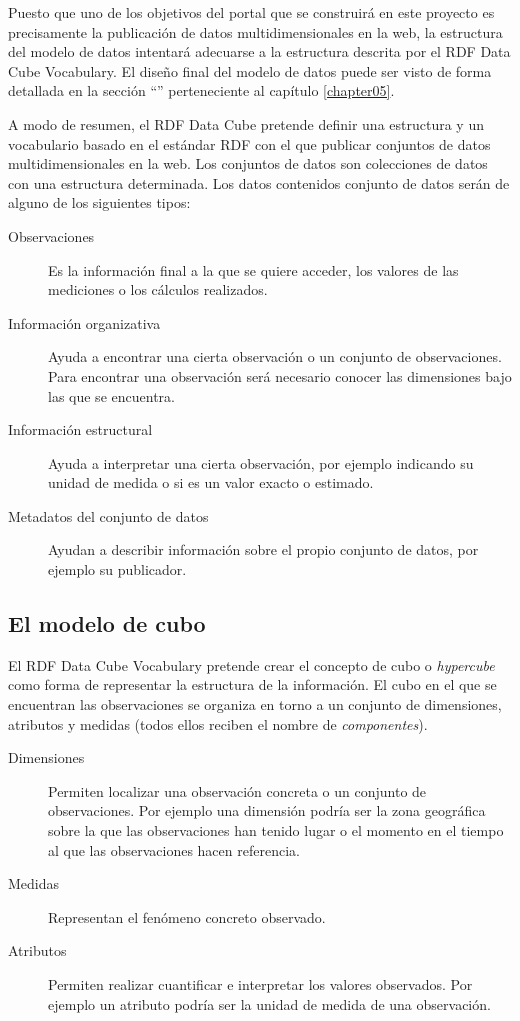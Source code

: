 Puesto que uno de los objetivos del portal que se construirá en este proyecto es precisamente la publicación de datos multidimensionales en la web, la estructura del modelo de datos intentará adecuarse a la estructura descrita por el RDF Data Cube Vocabulary.  El diseño final del modelo de datos puede ser visto de forma detallada en la sección ``'' perteneciente al capítulo \ref{chapter05}.

A modo de resumen, el RDF Data Cube pretende definir una estructura y un vocabulario basado en el estándar RDF con el que publicar conjuntos de datos multidimensionales en la web.  Los conjuntos de datos son colecciones de datos con una estructura determinada.  Los datos contenidos conjunto de datos serán de alguno de los siguientes tipos:
\begin{description}
\item[Observaciones]  Es la información final a la que se quiere acceder, los valores de las mediciones o los cálculos realizados.
\item[Información organizativa]  Ayuda a encontrar una cierta observación o un conjunto de observaciones.  Para encontrar una observación será necesario conocer las dimensiones bajo las que se encuentra.
\item[Información estructural]   Ayuda a interpretar una cierta observación, por ejemplo indicando su unidad de medida o si es un valor exacto o estimado.
\item[Metadatos del conjunto de datos]  Ayudan a describir información sobre el propio conjunto de datos, por ejemplo su publicador.
\end{description}

\subsection{El modelo de cubo}
El RDF Data Cube Vocabulary pretende crear el concepto de cubo o \textit{hypercube} como forma de representar la estructura de la información. El cubo en el que se encuentran las observaciones se organiza en torno a un conjunto de dimensiones, atributos y medidas (todos ellos reciben el nombre de \textit{componentes}).
\begin{description}
\item[Dimensiones]  Permiten localizar una observación concreta o un conjunto de observaciones.  Por ejemplo una dimensión podría ser la zona geográfica sobre la que las observaciones han tenido lugar o el momento en el tiempo al que las observaciones hacen referencia.
\item[Medidas]  Representan el fenómeno concreto observado.
\item[Atributos]  Permiten realizar cuantificar e interpretar los valores observados.  Por ejemplo un atributo podría ser la unidad de medida de una observación.
\end{description}

